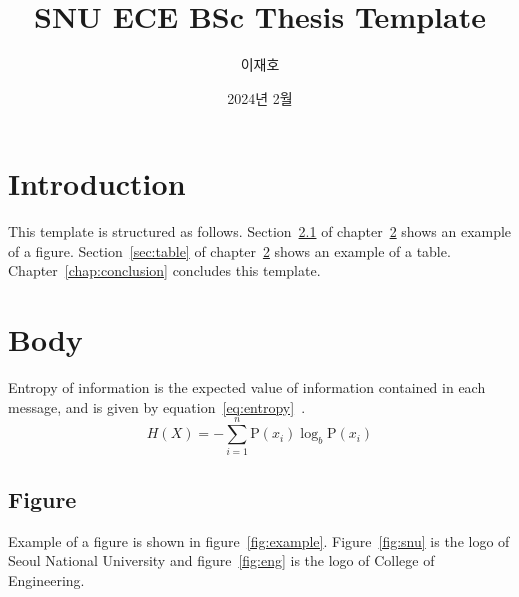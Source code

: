 \documentclass[en]{snu-ece-bsc-thesis}
\title{SNU ECE BSc Thesis Template}
\author{이재호}
\date{2024년 2월}
\begin{document}
\maketitle

\begin{abstract}
  \lipsum[1]
\end{abstract}

\tableofcontents
\listoftables
\listoffigures

\chapter{Introduction}\label{chap:introduction}
This template is structured as follows.
Section~\ref{sec:figure} of chapter~\ref{chap:body} shows an example of a figure.
Section~\ref{sec:table} of chapter~\ref{chap:body} shows an example of a table.
Chapter~\ref{chap:conclusion} concludes this template.

\lipsum[2-3]


\chapter{Body}\label{chap:body}
Entropy of information is the expected value of information contained in each message, and is given by equation~\eqref{eq:entropy}~\cite{6773024}.
\begin{equation}\label{eq:entropy}
  H(X) = -\sum_{i=1}^n {\mathrm{P}(x_i) \log_b \mathrm{P}(x_i)}
\end{equation}

\lipsum[4-6]


\section{Figure}\label{sec:figure}
Example of a figure is shown in figure~\ref{fig:example}.
Figure~\ref{fig:snu} is the logo of Seoul National University and figure~\ref{fig:eng} is the logo of College of Engineering.
\end{document}

